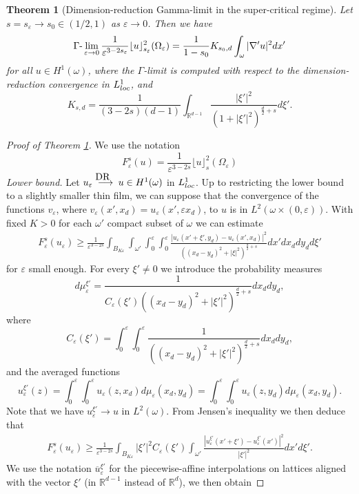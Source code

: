 \documentclass[10pt,a4paper]{amsart}
\newtheorem{theorem}{Theorem}
\def\e{\varepsilon}
\begin{document}
\begin{theorem}[Dimension-reduction Gamma-limit in the super-critical regime]\label{Gammaths0} Let $s=s_\e\to s_0\in(1/2,1)$ as $\e\to 0$. 
Then we have
$$
\Gamma\hbox{-}\lim_{\e\to 0} \frac{1}{\e^{3-2s_\e}}\lfloor u\rfloor_{s_\e}^2(\Omega_\e)= \frac1{1-s_0} K_{s_0,d}\int_\omega |\nabla'u|^2dx'
$$
for all $u\in H^1(\omega)$, where the $\Gamma$-limit is computed with respect to the dimension-reduction convergence in $L^1_{\rm loc}$, and
\begin{equation}
K_{s,d}=  \frac{1}{(3-2s)(d-1)} \int_{
 \mathbb R^{d-1}}\frac{|\xi'|^2}{(1+|\xi'|^2)^{\frac d2+s}}d\xi'.
\end{equation}
\end{theorem}

\begin{proof}[Proof of Theorem \rm\ref{Gammaths0}] We use the notation
$$
F^s_\e(u)=\frac{1}{\e^{3-2s}}\lfloor u\rfloor_{s}^2(\Omega_\e)
$$
{\em Lower bound.}
Let $u_\e\buildrel{\hbox {\rm\scriptsize DR }\, \, }\over{\longrightarrow} u\in H^1(\omega)$ in $L^1_{\rm loc}$. Up to restricting the lower bound to a slightly smaller thin film, we can suppose that the convergence of the functions $v_\e$, where $v_\e(x',x_d)= u_\e(x', \e x_d)$, to $u$ is in $L^2(\omega\times (0,\e))$. With fixed $K>0$ for each $\omega'$ compact subset of $\omega$ we can estimate
\begin{eqnarray}
\label{newest}
F^s_\e(u_\e)\ge\frac{1}{\e^{3-2s}}\int_{B_{K\e}}\int_{\omega'}
\int_0^\e\int_0^\e \frac{|u_\e(x'+\xi',y_d)-u_\e(x',x_d)|^2}{((x_d-y_d)^2+|\xi|^2)^{\frac d2+s}}dx' dx_d dy_d d\xi'
\end{eqnarray}
for $\e$ small enough.
For every $\xi'\neq 0$ we introduce the probability measures
$$
d\mu_\e^{\xi'}=\frac{1}{C_\e(\xi') ((x_d-y_d)^2+|\xi'|^2)^{\frac d2+s}}dx_d dy_d,
$$
where
\begin{equation}\label{defCexi}
C_\e(\xi')=\int_0^\e\int_0^\e\frac{1}{((x_d-y_d)^2+|\xi'|^2)^{\frac d2+s}}dx_d dy_d,
\end{equation}
and the averaged functions
$$
u^{\xi'}_\e(z)=\int_0^\e\int_0^\e u_\e(z,x_d)d\mu_\e(x_d,y_d)=\int_0^\e\int_0^\e u_\e(z,y_d)d\mu_\e(x_d,y_d).
$$
Note that we have $u^{\xi'}_\e\to u$ in $L^2(\omega)$. From Jensen's inequality we then deduce that
\begin{eqnarray*}
F^s_\e(u_\e)\ge\frac{1}{\e^{3-2s}}\int_{B_{K\e}}|\xi'|^2 C_\e(\xi') \int_{\omega'}
\frac{|u^{\xi'}_\e(x'+\xi')-u^{\xi'}_\e(x')|^2}{|\xi'|^2} dx' d\xi'.
\end{eqnarray*}
We use the notation $\overline u_\e^{\xi'}$ for the piecewise-affine interpolations on lattices aligned with the vector $\xi'$ (in $\mathbb R^{d-1}$ instead of $\mathbb R^d$), we then obtain 

\end{proof}
\end{document}
